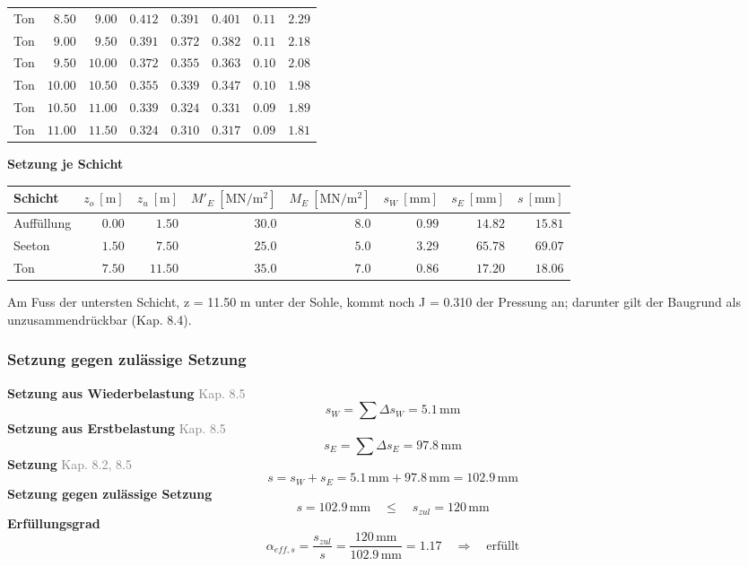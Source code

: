 \documentclass[11pt,a4paper]{article}
\newcommand{\normref}[1]{{\small\textcolor{gray}{#1}}}
\begin{document}
\begin{longtable}{lrrrrrrr}
Ton & $8.50$ & $9.00$ & $0.412$ & $0.391$ & $0.401$ & $0.11$ & $2.29$ \\
Ton & $9.00$ & $9.50$ & $0.391$ & $0.372$ & $0.382$ & $0.11$ & $2.18$ \\
Ton & $9.50$ & $10.00$ & $0.372$ & $0.355$ & $0.363$ & $0.10$ & $2.08$ \\
Ton & $10.00$ & $10.50$ & $0.355$ & $0.339$ & $0.347$ & $0.10$ & $1.98$ \\
Ton & $10.50$ & $11.00$ & $0.339$ & $0.324$ & $0.331$ & $0.09$ & $1.89$ \\
Ton & $11.00$ & $11.50$ & $0.324$ & $0.310$ & $0.317$ & $0.09$ & $1.81$ \\
\hline
\end{longtable}
\noindent\textbf{Setzung je Schicht}
\begin{longtable}{lrrrrrrr}
\hline
Schicht & $z_o\ [\mathrm{m}]$ & $z_u\ [\mathrm{m}]$ & $M'_E\ [\mathrm{MN}/\mathrm{m}^{2}]$ & $M_E\ [\mathrm{MN}/\mathrm{m}^{2}]$ & $s_W\ [\mathrm{mm}]$ & $s_E\ [\mathrm{mm}]$ & $s\ [\mathrm{mm}]$ \\
\hline
\endhead
Auffüllung & $0.00$ & $1.50$ & $30.0$ & $8.0$ & $0.99$ & $14.82$ & $15.81$ \\
Seeton & $1.50$ & $7.50$ & $25.0$ & $5.0$ & $3.29$ & $65.78$ & $69.07$ \\
Ton & $7.50$ & $11.50$ & $35.0$ & $7.0$ & $0.86$ & $17.20$ & $18.06$ \\
\hline
\end{longtable}
Am Fuss der untersten Schicht, z = 11.50 m unter der Sohle, kommt noch J = 0.310 der Pressung an; darunter gilt der Baugrund als unzusammendrückbar (Kap. 8.4).

\subsubsection{Setzung gegen zulässige Setzung}
\noindent\textbf{Setzung aus Wiederbelastung} \hfill \normref{Kap. 8.5}
\begin{equation*}
s_W = \sum \Delta s_W = 5.1\,\mathrm{mm}
\end{equation*}
\noindent\textbf{Setzung aus Erstbelastung} \hfill \normref{Kap. 8.5}
\begin{equation*}
s_E = \sum \Delta s_E = 97.8\,\mathrm{mm}
\end{equation*}
\noindent\textbf{Setzung} \hfill \normref{Kap. 8.2, 8.5}
\begin{equation*}
s = s_W + s_E = 5.1\,\mathrm{mm} + 97.8\,\mathrm{mm} = 102.9\,\mathrm{mm}
\end{equation*}
\noindent\textbf{Setzung gegen zulässige Setzung}
\begin{equation*}
s = 102.9\,\mathrm{mm} \quad \le \quad s_{zul} = 120\,\mathrm{mm}
\end{equation*}
\noindent\textbf{Erfüllungsgrad}
\begin{equation*}
\alpha_{eff,s} = \frac{s_{zul}}{s} = \frac{120\,\mathrm{mm}}{102.9\,\mathrm{mm}} = 1.17 \quad \Rightarrow \quad \text{erfüllt}
\end{equation*}
\end{document}
